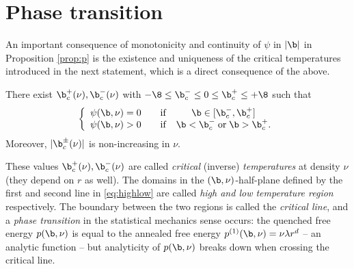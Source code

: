 \section{Phase transition}
An important  consequence of  monotonicity and continuity of $\psi$ in $|\b|$ in Proposition \ref{prop:p} is the existence and uniqueness of %
the critical temperatures introduced in the next statement, which is a direct consequence of the above.
\begin{theorem}\label{defdef..}
There exist $\b_c^+(\nu), \b_c^-(\nu)$ with  $-\8 \leq \b_c^- \leq 0 \leq \b_c^+ \leq + \8$ such that 
%
\begin{equation} \label{eq:highlow}
\left\{ 
\begin{array}{ccc}
\psi(\b,\nu)=0 \quad & {\rm if}  & \b \in [\b_c^-,\b_c^+]  \\
\psi(\b,\nu)>0 \quad  & {\rm if}  & \b < \b_c^- \; {\rm or} \; \b > \b_c^+.  
\end{array}
\right.
\end{equation}
Moreover,  $|\b_c^\pm(\nu)|$ is non-increasing in $\nu$.
\end{theorem}
These values $\b_c^+(\nu), \b_c^-(\nu)$ are called \emph{ critical} (inverse)  \emph{ temperatures} at density $\nu$ (they depend on $r$ as well).
The domains in the $(\b,\nu)$-half-plane defined by the first and second line in \eqref{eq:highlow} are called {\em high and low temperature region}
respectively. The boundary between the two regions is called the {\em critical line}, and a {\em phase transition} in the statistical mechanics sense occurs:
the quenched free energy $p(\b,\nu)$ is equal to the annealed free energy $p^{(1)}(\b,\nu)=\nu \lambda r^d$ 
-- an analytic function -- but analyticity of  $p(\b,\nu)$ breaks down when crossing the critical line.  
\medskip



